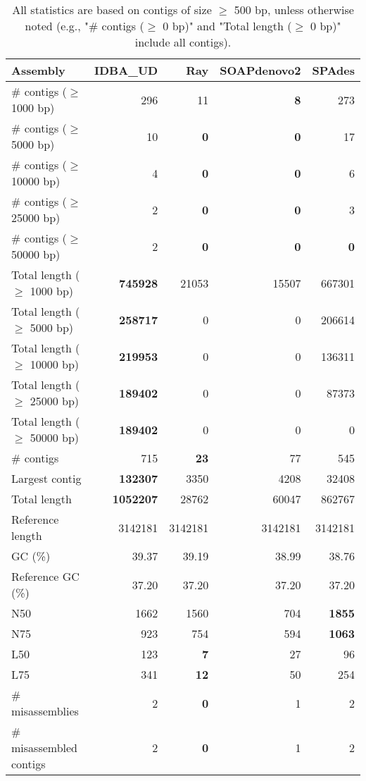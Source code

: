 \documentclass[12pt,a4paper]{article}
\begin{document}
\begin{table}[ht]
\begin{center}
\caption{All statistics are based on contigs of size $\geq$ 500 bp, unless otherwise noted (e.g., "\# contigs ($\geq$ 0 bp)" and "Total length ($\geq$ 0 bp)" include all contigs).}
\begin{tabular}{|l*{4}{|r}|}
\hline
Assembly & IDBA\_UD & Ray & SOAPdenovo2 & SPAdes \\ \hline
\# contigs ($\geq$ 1000 bp) & 296 & 11 & {\bf 8} & 273 \\ \hline
\# contigs ($\geq$ 5000 bp) & 10 & {\bf 0} & {\bf 0} & 17 \\ \hline
\# contigs ($\geq$ 10000 bp) & 4 & {\bf 0} & {\bf 0} & 6 \\ \hline
\# contigs ($\geq$ 25000 bp) & 2 & {\bf 0} & {\bf 0} & 3 \\ \hline
\# contigs ($\geq$ 50000 bp) & 2 & {\bf 0} & {\bf 0} & {\bf 0} \\ \hline
Total length ($\geq$ 1000 bp) & {\bf 745928} & 21053 & 15507 & 667301 \\ \hline
Total length ($\geq$ 5000 bp) & {\bf 258717} & 0 & 0 & 206614 \\ \hline
Total length ($\geq$ 10000 bp) & {\bf 219953} & 0 & 0 & 136311 \\ \hline
Total length ($\geq$ 25000 bp) & {\bf 189402} & 0 & 0 & 87373 \\ \hline
Total length ($\geq$ 50000 bp) & {\bf 189402} & 0 & 0 & 0 \\ \hline
\# contigs & 715 & {\bf 23} & 77 & 545 \\ \hline
Largest contig & {\bf 132307} & 3350 & 4208 & 32408 \\ \hline
Total length & {\bf 1052207} & 28762 & 60047 & 862767 \\ \hline
Reference length & 3142181 & 3142181 & 3142181 & 3142181 \\ \hline
GC (\%) & 39.37 & 39.19 & 38.99 & 38.76 \\ \hline
Reference GC (\%) & 37.20 & 37.20 & 37.20 & 37.20 \\ \hline
N50 & 1662 & 1560 & 704 & {\bf 1855} \\ \hline
N75 & 923 & 754 & 594 & {\bf 1063} \\ \hline
L50 & 123 & {\bf 7} & 27 & 96 \\ \hline
L75 & 341 & {\bf 12} & 50 & 254 \\ \hline
\# misassemblies & 2 & {\bf 0} & 1 & 2 \\ \hline
\# misassembled contigs & 2 & {\bf 0} & 1 & 2 \\ \hline

\end{tabular}
\end{center}
\end{table}
\end{document}
